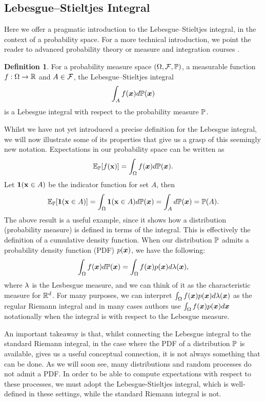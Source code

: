 \documentclass[a4paper,12pt,twoside,openright]{report}
\theoremstyle{definition}
\newtheorem{definition}{Definition}[section]
\begin{document}
\subsection{Lebesgue–Stieltjes Integral}
Here we offer a pragmatic introduction to the Lebesgue–Stieltjes integral, in the context of a probability space. For a more technical introduction, we point the reader to advanced probability theory or measure and integration courses \citep{ethmeasure,mitmeasure,cambprob}.
\begin{definition}\label{def:lebesgue}
For a probability measure space $\probspace$, a measurable function $f: \Omega \rightarrow \R $ and $A \in \calF$, the Lebesgue–Stieltjes integral
\begin{align}
    \int_{A} f(\vx) d\P(\vx)
\end{align}
is a Lebesgue integral with respect to the probability measure $\P$.
\end{definition}
Whilst we have not yet introduced a precise definition for the Lebesgue integral, we will now illustrate some of its properties that give us a grasp of this seemingly new notation.
Expectations in our probability space can be written as
\begin{align}
     \E_{\P}[f(\rvx)] = \int_{\Omega} f(\vx) d\P(\vx).
\end{align}
Let $\ind(\rvx \in A)$ be the indicator function for set $A$, then
\begin{align}
    \E_{\P}[\ind(\rvx \in A)] = \int_{\Omega} \ind(\rvx \in A) d\P(\vx) = \int_{A} d\P(\vx) = \P(A).
\end{align}
The above result is a useful example, since it shows how a distribution (probability measure) is defined in terms of the integral. This is effectively  the definition of a cumulative density function.
When our distribution $\P$ admits a probability density function (PDF) $p(\vx)$, we have the following:
\begin{align}
    \int_{\Omega} f(\vx) d\P(\vx) = \int_{\Omega} f(\vx)p(\vx) d\callambda(\vx),
\end{align}
where $\callambda$ is the Lesbesgue measure, and we can think of it as the characteristic measure for $\R^d$. For many purposes, we can interpret $\int_{\Omega} f(\vx)p(\vx) d\callambda(\vx)$ as the regular Riemann integral and in many cases authors \citep{williams2006gaussian} use $\int_{\Omega} f(\vx)p(\vx) d\vx$ notationally when the integral is with respect to the Lebesgue measure.

An important takeaway is that, whilst connecting the Lebesgue integral to the standard Riemann integral, in the case where the PDF of a distribution $\P$ is available, gives us a useful conceptual connection, it is not always something that can be done. As we will soon see, many distributions and random processes do not admit a PDF. In order to be able to compute expectations with respect to these processes, we must adopt the Lebesgue-Stieltjes integral, which is well-defined in these settings, while the standard Riemann integral is not.
\end{document}

